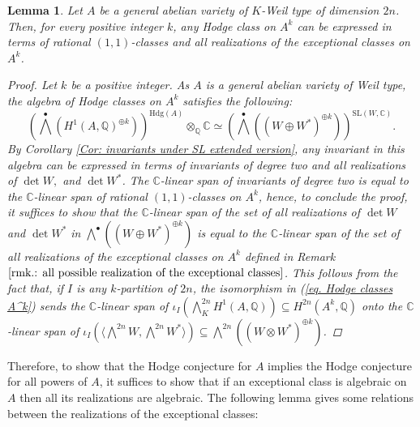 \documentclass[11pt,twoside,a4paper]{amsart}
\newcommand{\0}{\mathscr{O}}
\newcommand{\Q}{\mathbb{Q}}
\newcommand{\C}{\mathbb{C}}
\theoremstyle{plain}
\newtheorem{lem}[thm]{Lemma}
\theoremstyle{definition}
\theoremstyle{remark}
\begin{document}
\begin{lem}
\label{Lem.: Hodge classes powers of abelian var of weil type}
Let $A$ be a general abelian variety of $K$-Weil type of dimension $2n$. Then, for every positive integer $k$, any Hodge class on $A^k$ can be expressed in terms of rational $(1,1)$-classes and all realizations of the exceptional classes on $A^k$.
\begin{proof}
Let $k$ be a positive integer. As $A$ is a general abelian variety of Weil type, the algebra of Hodge classes on $A^k$ satisfies the following:
\begin{equation}
    \label{eq. Hodge classes A^k}
    \textstyle\left(\bigwedge^{\bullet}(H^1(A,\Q)^{\oplus k})\right)^{\mathrm{Hdg}(A)}\otimes_\Q\C\simeq \textstyle\left(\bigwedge^{\bullet}((W\oplus W^*)^{\oplus k})\right)^{\mathrm{SL}(W,\C)}.
\end{equation}
By Corollary \ref{Cor: invariants under SL extended version}, any invariant in this algebra can be expressed in terms of invariants of degree two and all realizations of $\det W,$ and $\det W^*$. The $\C$-linear span of invariants of degree two is equal to the $\C$-linear span of rational $(1,1)$-classes on $A^k$, hence, to conclude the proof, it suffices to show that the $\C$-linear span of the set of all realizations of $\det W$ and $\det W^*$ in $\bigwedge^{\bullet}((W\oplus W^*)^{\oplus k})$ is equal to the $\C$-linear span of the set of all realizations of the exceptional classes on $A^k$ defined in Remark $\ref{rmk.: all possible realization of the exceptional classes}$. This follows from the fact that, if $I$ is any $k$-partition of $2n$, the isomorphism in (\ref{eq. Hodge classes A^k}) sends the $\C$-linear span of $\iota_I\left(\bigwedge^{2n}_K H^1(A,\Q)\right)\subseteq H^{2n}(A^k,\Q)$ onto the
$\C$-linear span of $\iota_I\left(\langle \bigwedge^{2n} W,\bigwedge^{2n}W^*\rangle\right)\subseteq \bigwedge^{2n}\left((W\otimes W^*)^{\oplus k}\right)$.
\end{proof}
\end{lem}
Therefore, to show that the Hodge conjecture for $A$ implies the Hodge conjecture for all powers of $A$, it suffices to show that if an exceptional class is algebraic on $A$ then all its realizations are algebraic. 
The following lemma gives some relations between the realizations of the exceptional classes:
\end{document}
